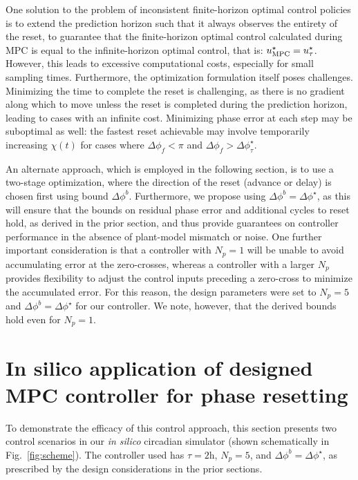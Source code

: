 One solution to the problem of inconsistent finite-horizon optimal control policies is to extend the prediction horizon such that it always observes the entirety of the reset, to guarantee that the finite-horizon optimal control calculated during MPC is equal to the infinite-horizon optimal control, that is: $u^\star_{\rm MPC} = u^\star_{\rm \tau}$.
However, this leads to excessive computational costs, especially for small sampling times.
Furthermore, the optimization formulation itself poses challenges.
Minimizing the time to complete the reset is challenging, as there is no gradient along which to move unless the reset is completed during the prediction horizon, leading to cases with an infinite cost.
Minimizing phase error at each step may be suboptimal as well: the fastest reset achievable may involve temporarily increasing $\chi(t)$ for cases where $\Delta\phi_f<\pi$ and $\Delta\phi_f>\Delta\phi_\tau^\star$.

An alternate approach, which is employed in the following section, is to use a two-stage optimization, where the direction of the reset (advance or delay) is chosen first using bound $\Delta\phi^b$.
Furthermore, we propose using  $\Delta\phi^b = \Delta\phi^\star$, as this will ensure that the bounds on residual phase error and additional cycles to reset hold, as derived in the prior section, and thus provide guarantees on controller performance in the absence of plant-model mismatch or noise.
One further important consideration is that a controller with $N_p = 1$ will be unable to avoid accumulating error at the zero-crosses, whereas a controller with a larger $N_p$ provides flexibility to adjust the control inputs preceding a zero-cross to minimize the accumulated error.
For this reason, the design parameters were set to $N_p = 5$ and $\Delta\phi^b= \Delta\phi^\star$ for our controller.
We note, however, that the derived bounds hold even for $N_p=1$.

\section{In silico application of designed MPC controller for phase resetting\label{sec:ex}}
To demonstrate the efficacy of this control approach, this section presents two control scenarios in our \textit{in silico} circadian simulator (shown schematically in Fig.~\ref{fig:scheme}).
The controller used has $\tau=2$h, $N_p = 5$, and $\Delta\phi^b = \Delta\phi^\star$, as prescribed by the design considerations in the prior sections.



